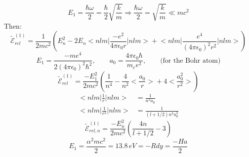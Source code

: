 \documentclass[12pt,fancychapters]{report}
\numberwithin{equation}{section}
\begin{document}
\[
  E_1 = \frac{\hbar\omega}{2} = \frac{\hbar}{2}\sqrt{\frac{k}{m}} \Rightarrow 
  \frac{\hbar\omega}{2} = \sqrt{\frac{k}{m}}\ll mc^2
\]
Then:
\[
  \tilde{\mathcal{E}}^{(1)}_{rel} = \frac{1}{2mc^2}\left( E_n^2 - 2E_n\bigg<
  nlm \bigg|\frac{-e^2}{4\pi\epsilon_0 r} \bigg|nlm\bigg> + \bigg<nlm\bigg|\frac{e^4}
{(4\pi\epsilon_0)^2r^2}\bigg|nlm\bigg>\right)
\]
\[
  E_1 = \frac{-me^4}{2(4\pi\epsilon_0)^2\hbar^2}, \qquad a_0 = \frac{4\pi\epsilon_0\hbar}{m_ee^2},
  \qquad \text{(for the Bohr atom)}
\]
\[
  \tilde{\mathcal{E}}^{(1)}_{rel} = \frac{-E_1^2}{2mc^2} \left(\frac{1}{n^4}- \frac{4}{n^2}
  \bigg<\frac{a_0}{r}\bigg> + 4 \bigg<\frac{a_0^2}{r^2}\bigg>\right)
\]
\begin{align*}
  \bigg<nlm\bigg|\frac{1}{r}\bigg|nlm\bigg> &= \frac{1}{n^2a_0} \\
  \bigg<nlm\bigg|\frac{1}{r^2}\bigg|nlm\bigg> &= \frac{1}{(l+1/2)n^3a_0^2}
\end{align*}
\[
  \boxed{\tilde{\mathcal{E}}^{(1)}_{rel, n} = \frac{-E_n^2}{2mc^2}\left(\frac{4n}{l+1/2}-3\right)}
\]
\[
  E_1 = \frac{\alpha^2mc^2}{2} = 13.8\,eV = -Rdy = \frac{-Ha}{2}
\]
\end{document}
